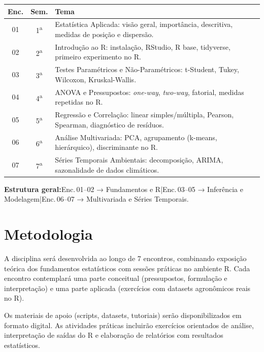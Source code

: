 \documentclass[11pt,a4paper]{article}
\begin{document}
\begin{small}
\renewcommand{\arraystretch}{1.35}
\begin{tabularx}{\textwidth}{@{}c c X@{}}
\toprule
\textbf{Enc.} & \textbf{Sem.} & \textbf{Tema} \\
\midrule
01 & 1\textsuperscript{a} & Estatística Aplicada: visão geral, importância, descritiva, medidas de posição e dispersão. \\
02 & 2\textsuperscript{a} & Introdução ao R: instalação, RStudio, R base, tidyverse, primeiro experimento no R. \\
03 & 3\textsuperscript{a} & Testes Paramétricos e Não-Paramétricos: t-Student, Tukey, Wilcoxon, Kruskal-Wallis. \\
04 & 4\textsuperscript{a} & ANOVA e Pressupostos: \textit{one-way}, \textit{two-way}, fatorial, medidas repetidas no R. \\
05 & 5\textsuperscript{a} & Regressão e Correlação: linear simples/múltipla, Pearson, Spearman, diagnóstico de resíduos. \\
06 & 6\textsuperscript{a} & Análise Multivariada: PCA, agrupamento (k-means, hierárquico), discriminante no R. \\
07 & 7\textsuperscript{a} & Séries Temporais Ambientais: decomposição, ARIMA, sazonalidade de dados climáticos. \\
\bottomrule
\end{tabularx}
\end{small}

\begin{tcolorbox}[uefsbox]
\textbf{Estrutura geral:}\enspace Enc.\,01--02 → Fundamentos e R\enspace|\enspace Enc.\,03--05 → Inferência e Modelagem\enspace|\enspace Enc.\,06--07 → Multivariada e Séries Temporais.
\end{tcolorbox}


\section*{Metodologia}

A disciplina será desenvolvida ao longo de 7 encontros, combinando exposição teórica dos fundamentos estatísticos com sessões práticas no ambiente R. Cada encontro contemplará uma parte conceitual (pressupostos, formulação e interpretação) e uma parte aplicada (exercícios com datasets agronômicos reais no R).

Os materiais de apoio (scripts, datasets, tutoriais) serão disponibilizados em formato digital. As atividades práticas incluirão exercícios orientados de análise, interpretação de saídas do R e elaboração de relatórios com resultados estatísticos.
\end{document}
